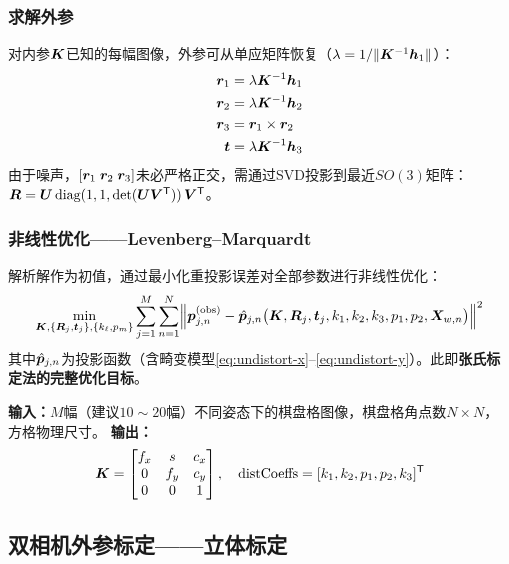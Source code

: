 \subsubsection{求解外参}
对内参$\bm{K}$已知的每幅图像，外参可从单应矩阵恢复（$\lambda = 1/\|\bm{K}^{-1}\bm{h}_1\|$）：
\begin{align}
\bm{r}_1 &= \lambda \bm{K}^{-1} \bm{h}_1 \label{eq:ext-r1} \\
\bm{r}_2 &= \lambda \bm{K}^{-1} \bm{h}_2 \label{eq:ext-r2} \\
\bm{r}_3 &= \bm{r}_1 \times \bm{r}_2 \label{eq:ext-r3} \\
\bm{t}   &= \lambda \bm{K}^{-1} \bm{h}_3 \label{eq:ext-t}
\end{align}
由于噪声，$[\bm{r}_1\; \bm{r}_2\; \bm{r}_3]$未必严格正交，需通过SVD投影到最近$SO(3)$矩阵：$\bm{R} = \bm{U}\,\text{diag}(1,1,\det(\bm{U}\bm{V}^{\mathsf{T}}))\,\bm{V}^{\mathsf{T}}$。
\subsubsection{非线性优化——Levenberg--Marquardt}
解析解作为初值，通过最小化重投影误差对全部参数进行非线性优化：
\begin{equation}
\min_{\bm{K},\{\bm{R}_j,\bm{t}_j\},\{k_\ell,p_m\}}
\sum_{j=1}^{M}\sum_{n=1}^{N}
\Bigl\|\bm{p}_{j,n}^{\text{(obs)}} - \hat{\bm{p}}_{j,n}\bigl(\bm{K}, \bm{R}_j, \bm{t}_j, k_1,k_2,k_3,p_1,p_2, \bm{X}_{w,n}\bigr)\Bigr\|^2
\label{eq:lm-opt}
\end{equation}
其中$\hat{\bm{p}}_{j,n}$为投影函数（含畸变模型\eqref{eq:undistort-x}--\eqref{eq:undistort-y}）。此即\textbf{张氏标定法的完整优化目标}。
\begin{resultbox}[单相机标定所需的输入与输出]
\textbf{输入：}$M$幅（建议$10\sim20$幅）不同姿态下的棋盘格图像，棋盘格角点数$N \times N$，方格物理尺寸。
\textbf{输出：}
\[
\bm{K} = \begin{bmatrix} f_x & s & c_x \\ 0 & f_y & c_y \\ 0 & 0 & 1 \end{bmatrix},\quad
\text{distCoeffs} = [k_1, k_2, p_1, p_2, k_3]^{\mathsf{T}}
\]
\end{resultbox}

\subsection{双相机外参标定——立体标定}
\label{sec:stereo-calib}


